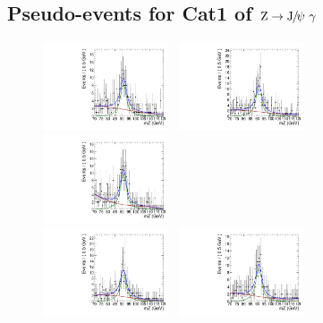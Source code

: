 \subsection{Pseudo-events for Cat1 of $\mathrm{Z}\to{\mathrm{J}\hspace{-.08em}/\hspace{-.14em}\psi}\ \gamma$}
\begin{figure}[!ht]
  \centering
  \includegraphics[width=0.33\textwidth]{Fig/BiasStudy/Toys/ZJpsiG_Cat1/TruePdf2_FitPdf2_mu200_sbfit_12350_cat1}~
  \includegraphics[width=0.33\textwidth]{Fig/BiasStudy/Toys/ZJpsiG_Cat1/TruePdf2_FitPdf2_mu200_sbfit_1231_cat1}~
  \includegraphics[width=0.33\textwidth]{Fig/BiasStudy/Toys/ZJpsiG_Cat1/TruePdf2_FitPdf2_mu200_sbfit_12345_cat1}\\
  \includegraphics[width=0.33\textwidth]{Fig/BiasStudy/Toys/ZJpsiG_Cat1/TruePdf2_FitPdf2_mu200_sbfit_12328_cat1}~
  \includegraphics[width=0.33\textwidth]{Fig/BiasStudy/Toys/ZJpsiG_Cat1/TruePdf2_FitPdf2_mu200_sbfit_12339_cat1}~

\end{figure}
